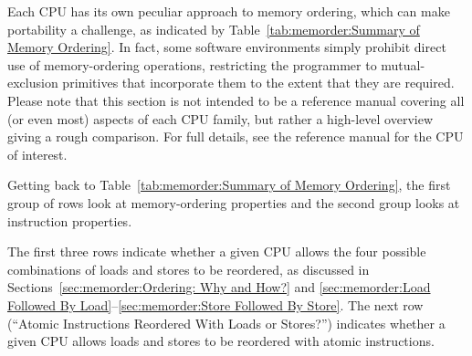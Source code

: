\begin{table}[tbh]
\vspace{5pt}\hfill
{}\OneColumnHSpace{-0.4in}
\caption{Summary of Memory Ordering}
\label{tab:memorder:Summary of Memory Ordering}
\end{table}

Each CPU has its own peculiar approach to memory ordering, which
can make portability a challenge, as indicated by
Table~\ref{tab:memorder:Summary of Memory Ordering}.
In fact, some software environments simply prohibit
direct use of memory-ordering operations, restricting the programmer
to mutual-exclusion primitives that incorporate them to the extent that
they are required.  Please note that this section is not intended to be
a reference manual
covering all (or even most) aspects of each CPU family, but rather
a high-level overview giving a rough comparison.
For full details, see the reference manual for the CPU of interest.

Getting back to
Table~\ref{tab:memorder:Summary of Memory Ordering},
the first group of rows look at memory-ordering
properties and the second group looks at instruction properties.

The first three rows indicate whether a given CPU allows the four
possible combinations of loads and stores to be reordered, as discussed
in
Sections~\ref{sec:memorder:Ordering: Why and How?} and
\ref{sec:memorder:Load Followed By Load}--\ref{sec:memorder:Store Followed By Store}.
The next row (``Atomic Instructions Reordered With Loads or Stores?'')
indicates whether a given CPU allows loads and stores
to be reordered with atomic instructions.

